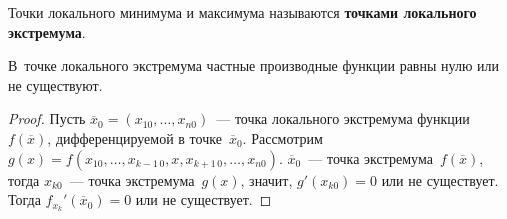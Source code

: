 Точки локального минимума и максимума называются \textbf{точками локального экстремума}.
	
\begin{theorem}
В~точке локального экстремума частные производные функции равны нулю или не существуют.
\end{theorem}
\begin{proof}
Пусть $\overline x_0 = (x_{10}, \ldots, x_{n0})$~--- точка локального экстремума функции~$f(\overline x)$, дифференцируемой в точке~$\overline x_0$.
Рассмотрим $g(x) = f(x_{10}, \ldots, x_{k-1\,0}, x, x_{k+1\,0}, \ldots, x_{n0})$.
$\overline x_0$~--- точка экстремума~$f(\overline x)$, тогда $x_{k0}$~--- точка экстремума~$g(x)$, значит, $g'(x_{k0}) = 0$ или не существует.
Тогда $f_{x_k}'(\overline x_0) = 0$ или не существует.
\end{proof}

